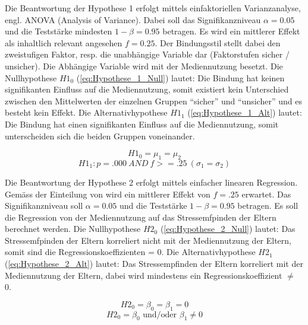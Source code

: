 Die Beantwortung der Hypothese 1 erfolgt mittels einfaktoriellen Varianzanalyse, engl. ANOVA (Analysis of Variance). Dabei soll das Signifikanzniveau $\alpha=0.05$ und die Teststärke mindesten $1-\beta=0.95$ betragen. Es wird ein mittlerer Effekt \cite{Cohen1988a} als inhaltlich relevant angesehen $f = 0.25$. Der Bindungsstil stellt dabei den zweistufigen Faktor, resp. die unabhängige Variable dar (Faktorstufen sicher / unsicher). Die Abhängige Variable wird mit der Mediennutzung besetzt. Die Nullhypothese $H1_{0}$ (\ref{eq:Hypothese_1_Null}) lautet: Die Bindung hat keinen signifikanten Einfluss auf die Mediennutzung, somit existiert kein Unterschied zwischen den Mittelwerten der einzelnen Gruppen \enquote{sicher} und \enquote{unsicher} und es besteht kein Effekt. Die Alternativhypothese $H1_{1}$ (\ref{eq:Hypothese_1_Alt})  lautet: Die Bindung hat einen signifikanten Einfluss auf die Mediennutzung, somit unterscheiden sich die beiden Gruppen voneinander.

\begin{equation}\label{eq:Hypothese_1_Null}
    H1_{0} = \mu_1 = \mu_2
\end{equation}
\begin{equation}\label{eq:Hypothese_1_Alt}
    H1_{1}:p=.000 ~ AND ~ f>=.25~ (\sigma_1 = \sigma_2)
\end{equation}

Die Beantwortung der Hypothese 2 erfolgt mittels einfacher linearen Regression. Gemäss der Einteilung von  wird ein mittlerer Effekt von $f=.25$ erwartet. Das Signifikanzniveau soll $\alpha=0.05$ und die Teststärke $1-\beta=0.95$ betragen. Es soll die Regression von der Mediennutzung auf das Stressemfpinden der Eltern berechnet werden. Die Nullhypothese $H2_{0}$ (\ref{eq:Hypothese_2_Null}) lautet: Das Stressemfpinden der Eltern korreliert nicht  mit der Mediennutzung der Eltern, somit sind die Regressionskoeffizienten = 0. Die Alternativhypothese $H2_{1}$ (\ref{eq:Hypothese_2_Alt}) lautet: Das Stressempfinden der Eltern korreliert mit der Mediennutzung der Eltern, dabei wird mindestens ein Regressionskoeffizient $\neq$ 0.

\begin{equation}\label{eq:Hypothese_2_Null}
    H2_{0}=\beta_0 = \beta_1 = 0
\end{equation}
\begin{equation}\label{eq:Hypothese_2_Alt}
    H2_{0}=\beta_0 \text{ und/oder } \beta_1 \neq 0
\end{equation}

